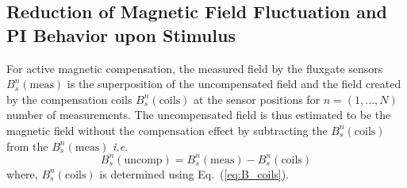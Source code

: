 
\subsection{Reduction of Magnetic Field Fluctuation and PI Behavior upon Stimulus}


For active magnetic compensation, the measured field by the fluxgate sensors $B_s^n(\text{meas})$ is the superposition of the uncompensated field and the field created by the compensation coils $B_s^n(\text{coils})$ at the sensor positions for $n=(1,...,N)$ number of measurements. The uncompensated field is thus estimated to be the magnetic field without the compensation effect by subtracting the $B_s^n(\text{coils})$ from the $B_s^n(\text{meas})$ {\it i.e.}
\begin{equation}\label{eq:Buncomp}
     B_s^n(\text{uncomp})=B_s^n(\text{meas})- B_s^n(\text{coils})
\end{equation}
where, $B_s^n(\text{coils})$ is determined using Eq.~(\ref{eq:B_coils}).




